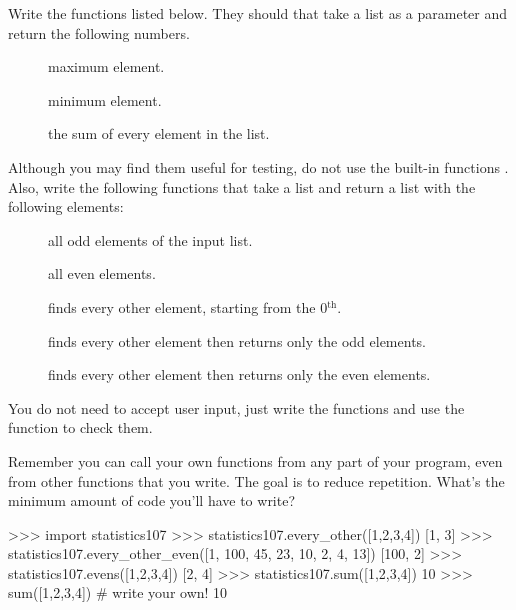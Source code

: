 \documentclass[11pt]{cselabheader}
\begin{document}
\begin{ex}[statistics107.py]
  Write the functions listed below. They should that take a list as a parameter
  and return the following numbers.

  \begin{description}
  \item[] maximum element.
  \item[] minimum element.
  \item[] the sum of every element in the list.
  \end{description}

  Although you may find them useful for testing, do not use the
  built-in functions .
  Also, write the following functions that take a list and return a list with the
  following elements:

  \begin{description}
  \item[] all odd elements of the input list.
  \item[] all even elements.
  \item[] finds every other element, starting from the 0$^\text{th}$.
  \item[] finds every other element then returns only the odd elements.
  \item[] finds every other element then returns only the even elements.
  \end{description}

  You do not need to accept user input, just write the functions and use the
  function  to check them.

  Remember you can call your own functions from any part of your program, even from
  other functions that you write.
  The goal is to reduce repetition.
  What's the minimum amount of code you'll have to write?

  \begin{pyconcode}
>>> import statistics107
>>> statistics107.every_other([1,2,3,4])
[1, 3]
>>> statistics107.every_other_even([1, 100, 45, 23, 10, 2, 4, 13])
[100, 2]
>>> statistics107.evens([1,2,3,4])
[2, 4]
>>> statistics107.sum([1,2,3,4])
10
>>> sum([1,2,3,4])  # write your own!
10

\end{pyconcode}
\end{ex}
\end{document}

